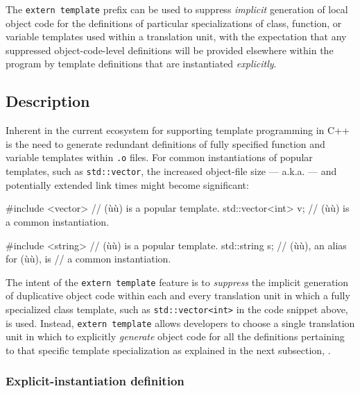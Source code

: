 

The \lstinline!extern!~\lstinline!template! prefix can be used to suppress
\emph{implicit} generation of local object code for the definitions of
particular specializations of class, function, or
variable templates used within a translation unit, with the
expectation that any suppressed object-code-level definitions will be
provided elsewhere within the program by template definitions that are
instantiated \emph{explicitly}.

\subsection[Description]{Description}\label{description}

Inherent in the current ecosystem for supporting template programming in
C++ is the need to generate redundant definitions of fully specified
function and variable templates within \lstinline!.o! files. For common
instantiations of popular templates, such as \lstinline!std::vector!, the
increased object-file size --- a.k.a.  --- and
potentially extended link times might become significant:

\begin{emcppslisting}
#include <vector>    // (ù{}ù) is a popular template.
std::vector<int> v;  // (ù{}ù) is a common instantiation.

#include <string>    // (ù{}ù) is a popular template.
std::string s;       // (ù{}ù), an alias for (ù{}ù), is
                     // a common instantiation.
\end{emcppslisting}

\noindent The intent of the \lstinline!extern!~\lstinline!template! feature is to
\emph{suppress} the implicit generation of duplicative object code
within each and every translation unit in which a fully specialized
class template, such as \lstinline!std::vector<int>! in the code snippet
above, is used. Instead, \lstinline!extern!~\lstinline!template! allows
developers to choose a single translation unit in which to explicitly
\emph{generate} object code for all the definitions pertaining to that
specific template specialization as explained in the next
subsection, .

\subsubsection[Explicit-instantiation definition]{Explicit-instantiation definition}\label{explicit-instantiation-definition}

